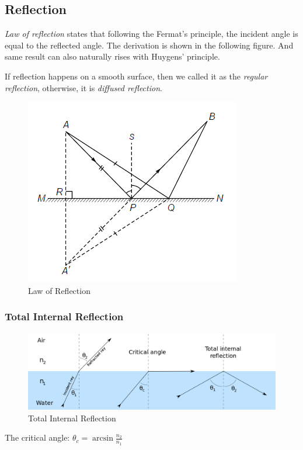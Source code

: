 \documentclass[openany]{book}
\begin{document}
\subsection{Reflection}
\emph{Law of reflection} states that following the Fermat's principle, the incident angle is equal to the reflected angle. The derivation is shown in the following figure. And same result can also naturally rises with Huygens' principle.

If reflection happens on a smooth surface, then we called it as the \emph{regular reflection}, otherwise, it is \emph{diffused reflection}.
\begin{figure}[H]
\centering
\label{fig:9}
\includegraphics[scale=1]{Figure/9.PNG}
\caption{Law of Reflection}
\end{figure}
\subsubsection{Total Internal Reflection}
\begin{figure}[H]
\centering
\label{fig:12}
\includegraphics[scale=0.2]{Figure/12.PNG}
\caption{Total Internal Reflection}
\end{figure}
The critical angle: $\theta _c=\arcsin \frac{n_2}{n_1}$
\end{document}
